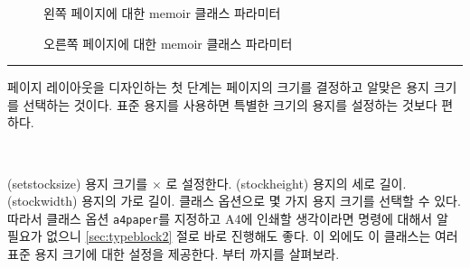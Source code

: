 \begin{figure}
\centering
\oddpagelayoutfalse
\drawstock
\caption{왼쪽 페이지에 대한 \textsf{memoir} 클래스 파라미터}
\label{fig:evenstock}
\end{figure}

\begin{figure}
\centering
\drawstock
\caption{오른쪽 페이지에 대한 \textsf{memoir} 클래스 파라미터}
\label{fig:oddstock}
\end{figure}


\fancybreak{}


페이지 레이아웃을 디자인하는 첫 단계는 페이지의 크기를 결정하고 알맞은
용지 크기를 선택하는 것이다. 표준 용지를 사용하면 특별한 크기의
용지를 설정하는 것보다 편하다.

\begin{syntax}
\cmd{\setstocksize} \\
\end{syntax}
\glossary(setstocksize)%
  {}%
  {용지 크기를  $\times$ 로 설정한다.}
\glossary(stockheight)%
  {}%
  {용지의 세로 길이.}
\glossary(stockwidth)%
  {}%
  {용지의 가로 길이.}
클래스 옵션으로 몇 가지 용지 크기를 선택할 수 있다.
따라서 클래스 옵션 \texttt{a4paper}를 지정하고 A4에 인쇄할 생각이라면
\cmd{\setstocksize} 명령에 대해서 알 필요가 없으니 \ref{sec:typeblock2} 절로
바로 진행해도 좋다. 이 외에도 이 클래스는 여러 표준 용지 크기에 대한
설정을 제공한다. 부터 까지를
살펴보라.

